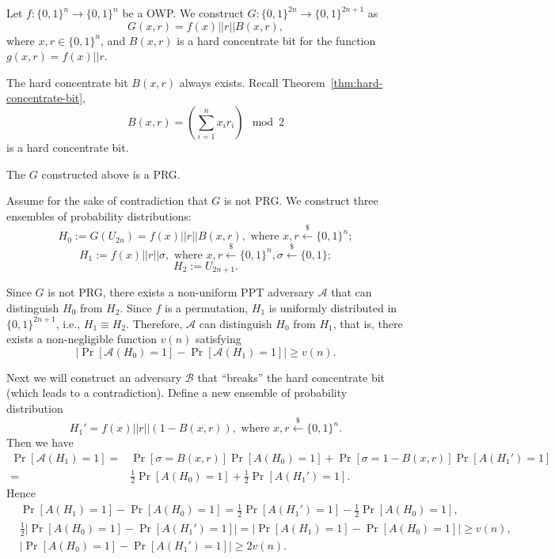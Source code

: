 \documentclass[12pt]{tufte-book}
\newcommand{\ma}{\mathcal{A}}
\begin{document}
\begin{construction}
Let $f: \{0, 1\}^n \rightarrow \{0, 1\}^n$ be a OWP. We construct $G: \{0, 1\}^{2n} \rightarrow \{0, 1\}^{2n+1}$ as
\[
G(x, r) = f(x) || r || B(x, r),
\]
where $x, r \in \{0, 1\}^n$, and $B(x, r)$ is a hard concentrate bit for the function $g(x,r) = f(x) || r$.
\end{construction}

\begin{remark}
The hard concentrate bit $B(x,r)$ always exists. Recall Theorem~\ref{thm:hard-concentrate-bit},
\[B(x,r) = \left(\sum_{i=1}^n x_i r_i\right)\mod 2\]
is a hard concentrate bit.
\end{remark}

\begin{theorem}
The $G$ constructed above is a PRG.
\end{theorem}

\proof
Assume for the sake of contradiction that $G$ is not PRG.
We construct three ensembles of probability distributions:
\[H_0 := G(U_{2n}) = f(x) || r || B(x, r), \text{ where } x, r \xleftarrow{\$} \{0, 1\}^n;\]
\[H_1 := f(x) || r || \sigma, \text{ where } x, r \xleftarrow{\$} \{0, 1\}^n, \sigma \xleftarrow{\$} \{0, 1\};\]
\[H_2 := U_{2n+1}.\]

Since $G$ is not PRG, there exists a non-uniform PPT adversary $\ma$ that can distinguish $H_0$ from $H_2$.
Since $f$ is a permutation, $H_1$ is uniformly distributed in $\{0, 1\}^{2n+1}$, i.e., $H_1 \equiv H_2$.
Therefore, $\ma$ can distinguish $H_0$ from $H_1$,
that is, there exists a non-negligible function $v(n)$ satisfying
\[
\big| \Pr[\ma(H_0)=1] - \Pr[\ma(H_1)=1] \big| \geq v(n).
\]

Next we will construct an adversary $\mathcal{B}$ that ``breaks'' the hard concentrate bit (which leads to a contradiction).
Define a new ensemble of probability distribution
\[
H_1' = f(x) || r || (1-B(x, r)) , \text{ where } x, r \xleftarrow{\$} \{0, 1\}^n.
\]
Then we have
\begin{align*}
\Pr[\ma(H_1) = 1]
=& \Pr[\sigma = B(x, r)] \Pr[A(H_0) = 1] + \Pr[\sigma = 1 - B(x, r)] \Pr[A(H_1') = 1]\\
=& \frac{1}{2} \Pr[A(H_0) = 1] + \frac{1}{2}\Pr[A(H_1') = 1].
\end{align*}
Hence
\begin{align*}
&\Pr[A(H_1) = 1] - \Pr[A(H_0) = 1]
=  \frac{1}{2}\Pr[A(H_1') = 1] - \frac{1}{2} \Pr[A(H_0) = 1],
\\
&\frac{1}{2} \left|\Pr[A(H_0) = 1] - \Pr[A(H_1') = 1] \right|
= \left| \Pr[A(H_1) = 1] - \Pr[A(H_0) = 1] \right|
\geq v(n),
\\
&\left|\Pr[A(H_0) = 1] - \Pr[A(H_1') = 1] \right|
\geq 2v(n).
\end{align*}
\end{document}
